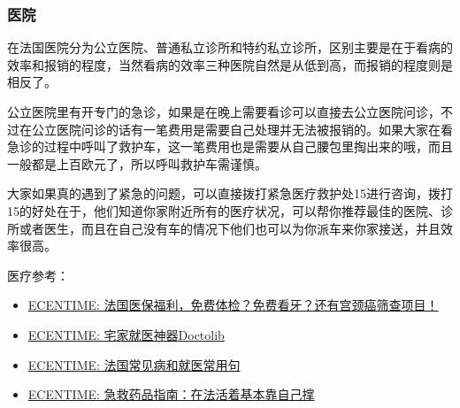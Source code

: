 \subsubsection{医院}
在法国医院分为公立医院、普通私立诊所和特约私立诊所，区别主要是在于看病的效率和报销的程度，当然看病的效率三种医院自然是从低到高，而报销的程度则是相反了。

公立医院里有开专门的急诊，如果是在晚上需要看诊可以直接去公立医院问诊，不过在公立医院问诊的话有一笔费用是需要自己处理并无法被报销的。如果大家在看急诊的过程中呼叫了救护车，这一笔费用也是需要从自己腰包里掏出来的哦，而且一般都是上百欧元了，所以呼叫救护车需谨慎。

大家如果真的遇到了紧急的问题，可以直接拨打紧急医疗救护处15进行咨询，拨打15的好处在于，他们知道你家附近所有的医疗状况，可以帮你推荐最佳的医院、诊所或者医生，而且在自己没有车的情况下他们也可以为你派车来你家接送，并且效率很高。

医疗参考：
\begin{itemize}
    \item \href{https://www.ecentime.com/article/ecentime-ameli-gratuit}{ECENTIME: 法国医保福利，免费体检？免费看牙？还有宫颈癌筛查项目！}
    \item \href{https://www.ecentime.com/article/comment-utiliser-doctolib-pendant-le-confinement}{ECENTIME: 宅家就医神器Doctolib}
    \item \href{https://www.dealmoon.fr/guide/1366}{ECENTIME: 法国常见病和就医常用句}
    \item \href{https://www.ecentime.com/article/2018-pharmacie-list}{ECENTIME: 急救药品指南：在法活着基本靠自己撑}
\end{itemize}
